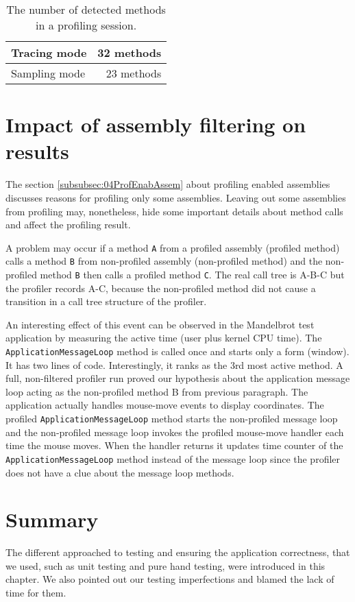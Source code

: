 \begin{table}[h!]
\centering
    \begin{tabular}{|l|r|}
        \hline
        Tracing mode  & 32 methods \\ \hline
        Sampling mode & 23 methods \\
        \hline
    \end{tabular}
     \caption{The number of detected methods in a profiling session. }
    \label{07tbl:compareResultsExactness}
\end{table}

\section{Impact of assembly filtering on results}
The section \ref{subsubsec:04ProfEnabAssem} about profiling enabled assemblies discusses reasons for profiling only some assemblies. Leaving out some assemblies from profiling may, nonetheless, hide some important details about method calls and affect the profiling result. 

A problem may occur if a method \texttt{A} from a profiled assembly (profiled method) calls a method \texttt{B} from non-profiled assembly (non-profiled method) and the non-profiled method \texttt{B} then calls a profiled method \texttt{C}. The real call tree is A-B-C but the profiler records A-C, because the non-profiled method did not cause a transition in a call tree structure of the profiler. 

An interesting effect of this event can be observed in the Mandelbrot test application by measuring the active time (user plus kernel CPU time). The \texttt{ApplicationMessageLoop} method is called once and starts only a form (window). It has two lines of code. Interestingly, it ranks as the 3rd most active method. A full, non-filtered profiler run proved our hypothesis about the application message loop acting as the non-profiled method B from previous paragraph. The application actually handles mouse-move events to display coordinates. The profiled \texttt{ApplicationMessageLoop} method starts the non-profiled message loop and the non-profiled message loop invokes the profiled mouse-move handler each time the mouse moves. When the handler returns it updates time counter of the \texttt{ApplicationMessageLoop} method instead of the message loop since the profiler does not have a clue about the message loop methods.

\section{Summary}
The different approached to testing and ensuring the application correctness, that we used, such as unit testing and pure hand testing, were introduced in this chapter. We also pointed out our testing imperfections and blamed the lack of time for them.

